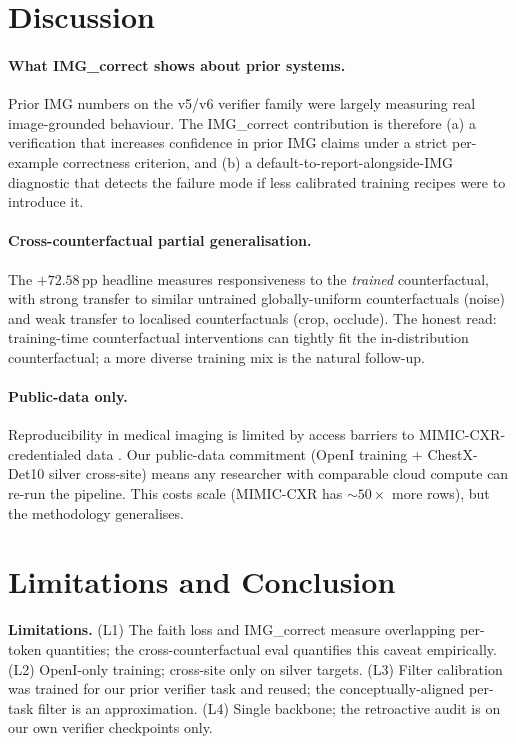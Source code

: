 \documentclass{article}
\begin{document}
\section{Discussion}

\paragraph{What IMG\_correct shows about prior systems.} Prior IMG
numbers on the v5/v6 verifier family were largely measuring real
image-grounded behaviour. The IMG\_correct contribution is
therefore (a) a verification that increases confidence in prior
IMG claims under a strict per-example correctness criterion, and
(b) a default-to-report-alongside-IMG diagnostic that detects the
failure mode if less calibrated training recipes were to introduce
it.

\paragraph{Cross-counterfactual partial generalisation.} The
$+72.58$\,pp headline measures responsiveness to the \emph{trained}
counterfactual, with strong transfer to similar untrained
globally-uniform counterfactuals (noise) and weak transfer to
localised counterfactuals (crop, occlude). The honest read:
training-time counterfactual interventions can tightly fit the
in-distribution counterfactual; a more diverse training mix is the
natural follow-up.

\paragraph{Public-data only.} Reproducibility in medical imaging is
limited by access barriers to MIMIC-CXR-credentialed data
\citep{johnson2019mimiccxr}. Our public-data commitment (OpenI
training $+$ ChestX-Det10 silver cross-site) means any researcher
with comparable cloud compute can re-run the pipeline. This costs
scale (MIMIC-CXR has $\sim 50\times$ more rows), but the
methodology generalises.

\section{Limitations and Conclusion}

\textbf{Limitations.} (L1) The faith loss and IMG\_correct measure
overlapping per-token quantities; the cross-counterfactual eval
quantifies this caveat empirically. (L2) OpenI-only training;
cross-site only on silver targets. (L3) Filter calibration was
trained for our prior verifier task and reused; the
conceptually-aligned per-task filter is an approximation. (L4)
Single backbone; the retroactive audit is on our own verifier
checkpoints only.
\end{document}
